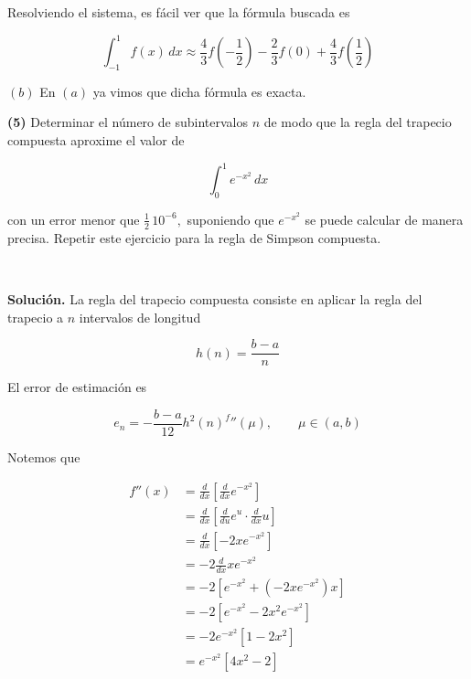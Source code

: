 \documentclass[12pt]{article}
\begin{document}
Resolviendo el sistema, es fácil ver que la fórmula buscada es 

\begin{equation*}
\int_{-1}^{1} f(x)\,dx
\approx
\frac43f\left(-\frac12\right)
-\frac23f(0)
+\frac43f\left(\frac12\right)
\end{equation*}

$(b)$ En $(a)$ ya vimos que dicha fórmula es exacta.

\pagebreak 

\begin{myframe}
    \textbf{(5)} Determinar el número de subintervalos \(n\) de modo que la regla del trapecio compuesta aproxime el valor de

\[
\int_0^1 e^{-x^2}\,dx
\]

con un error menor que $\frac{1}{2}\,10^{-6},$ suponiendo que \(e^{-x^2}\) se puede calcular de manera precisa. Repetir este ejercicio para la regla de Simpson compuesta.
\end{myframe}

~ 

\textbf{Solución.} La regla del trapecio compuesta consiste en aplicar la regla
del trapecio a $n$ intervalos de longitud 

\begin{equation*}
    h(n) = \frac{b-a}{n}
\end{equation*}

El error de estimación es 

\begin{equation*}
    e_n = -\frac{b-a}{12} h^2(n)^ f''(\mu), \qquad \mu \in (a, b)
\end{equation*}

Notemos que 

\begin{align*}
f''(x) 
&= \frac{d}{dx} \left[ \frac{d}{dx} e^{-x^2} \right] \\ 
&=\frac{d}{dx} \left[ \frac{d}{du} e^u \cdot \frac{d}{dx} u \right]  \\ 
&= \frac{d}{dx} \left[ -2xe^{-x^2} \right] \\ 
&=-2 \frac{d}{dx} xe^{-x^2} \\ 
&= -2 \left[ e^{-x^2} + ( -2xe^{-x^2} )x \right] \\ 
&=-2 \left[ e^{-x^2} - 2x^2 e^{-x^2} \right] \\ 
&=-2e^{-x^2} \left[ 1 - 2x^2 \right] \\ 
&=e^{-x^2}\left[ 4x^2 - 2 \right] 
\end{align*}
\end{document}
